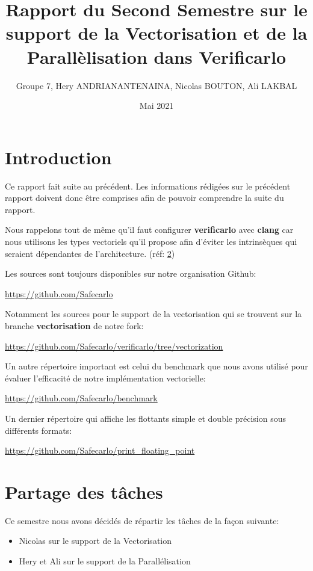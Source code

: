\documentclass[12pt, letterpaper]{article}
\author{Groupe 7, Hery ANDRIANANTENAINA, Nicolas BOUTON, Ali LAKBAL}
\date{Mai 2021}
\title{Rapport du Second Semestre sur le support de la Vectorisation et de la Parallèlisation dans Verificarlo}
\begin{document}
\maketitle
\tableofcontents


\section{Introduction}
\label{sec:org8061af7}

Ce rapport fait suite au précédent. Les informations rédigées sur le précédent
rapport doivent donc être comprises afin de pouvoir comprendre la suite du
rapport.

Nous rappelons tout de même qu'il faut configurer \textbf{verificarlo} avec \textbf{clang}
car nous utilisons les types vectoriels qu'il propose afin d'éviter les
intrinsèques qui seraient dépendantes de l'architecture. (réf: \hyperref[org1ac5fef]{2})

Les sources sont toujours disponibles sur notre organisation Github:

\url{https://github.com/Safecarlo}

Notamment les sources pour le support de la vectorisation qui se trouvent sur
la branche \textbf{vectorisation} de notre fork:

\url{https://github.com/Safecarlo/verificarlo/tree/vectorization}

Un autre répertoire important est celui du benchmark que nous avons utilisé
pour évaluer l'efficacité de notre implémentation vectorielle:

\url{https://github.com/Safecarlo/benchmark}

Un dernier répertoire qui affiche les flottants simple et double précision
sous différents formats:

\url{https://github.com/Safecarlo/print\_floating\_point}

\section{Partage des tâches}
\label{sec:org8a41248}

Ce semestre nous avons décidés de répartir les tâches de la façon suivante:
\begin{itemize}
\item Nicolas sur le support de la Vectorisation
\item Hery et Ali sur le support de la Parallélisation
\end{itemize}
\end{document}
